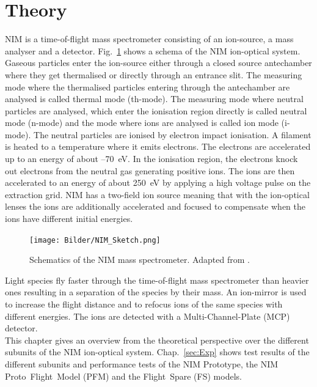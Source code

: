 \section{Theory} \label{sec:theory}

	NIM is a time-of-flight mass spectrometer consisting of an ion-source, a mass analyser and a detector. Fig.~\ref{fig:NIMSketch} shows a schema of the NIM ion-optical system. Gaseous particles enter the ion-source either through a closed source antechamber where they get thermalised or directly through an entrance slit. The measuring mode where the thermalised particles entering through the antechamber are analysed is called thermal mode (th-mode). The measuring mode where neutral particles are analysed, which enter the ionisation region directly is called neutral mode (n-mode) and the mode where ions are analysed is called ion mode (i-mode). The neutral particles are ionised by electron impact ionisation. A filament is heated to a temperature where it emits electrons. The electrons are accelerated up to an energy of about --70~eV. In the ionisation region, the electrons knock out electrons from the neutral gas generating positive ions. The ions are then accelerated to an energy of about 250~eV by applying a high voltage pulse on the extraction grid. NIM has a two-field ion source meaning that with the ion-optical lenses the ions are additionally accelerated and focused to compensate when the ions have different initial energies.
	\begin{figure}[h!]
		\centering
		\texttt{[image: Bilder/NIM\_Sketch.png]}
		\caption{Schematics of the NIM mass spectrometer. Adapted from \cite{Diss_Meyer}.}
		\label{fig:NIMSketch}
	\end{figure}
	Light species fly faster through the time-of-flight mass spectrometer than heavier ones resulting in a separation of the species by their mass. An ion-mirror is used to increase the flight distance and to refocus ions of the same species with different energies. The ions are detected with a Multi-Channel-Plate (MCP) detector.\\
	This chapter gives an overview from the theoretical perspective over the different subunits of the NIM ion-optical system.	Chap.~\ref{sec:Exp} shows test results of the different subunits and performance tests of the NIM Prototype, the NIM Proto~Flight~Model (PFM) and the Flight~Spare (FS) models.
		
